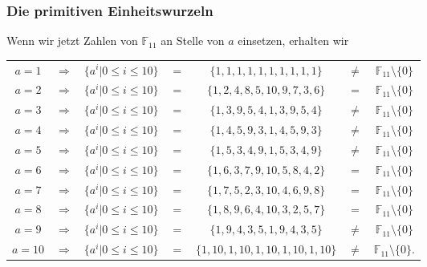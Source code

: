 \subsubsection{Die primitiven Einheitswurzeln
	\label{reedsolomon:subsection:primsqrt}}
%
%
Wenn wir jetzt Zahlen von $\mathbb{F}_{11}$ an Stelle von $a$ einsetzen, erhalten wir
\begin{center}
\begin{tabular}{c c c c c c c}
$a = 1$ & $\Rightarrow$ & $\{a^i | 0 \le i \le 10\}$ & $=$ & $\{1, 1, 1, 1, 1, 1, 1, 1, 1, 1\}$ & $\neq$ & $\mathbb{F}_{11}\setminus\{0\}$ \\
$a = 2$ & $\Rightarrow$ & $\{a^i | 0 \le i \le 10\}$ & $=$ & $\{1, 2, 4, 8, 5, 10, 9, 7, 3, 6\}$ & $ = $ & $\mathbb{F}_{11}\setminus\{0\}$ \\
$a = 3$ & $\Rightarrow$ & $\{a^i | 0 \le i \le 10\}$ & $=$ & $\{1, 3, 9, 5, 4, 1, 3, 9, 5, 4\}$ & $\neq$ & $\mathbb{F}_{11}\setminus\{0\}$ \\
$a = 4$ & $\Rightarrow$ & $\{a^i | 0 \le i \le 10\}$ & $=$ & $\{1, 4, 5, 9, 3, 1, 4, 5, 9, 3\}$ & $\neq$ & $\mathbb{F}_{11}\setminus\{0\}$ \\
$a = 5$ & $\Rightarrow$ & $\{a^i | 0 \le i \le 10\}$ & $=$ & $\{1, 5, 3, 4, 9, 1, 5, 3, 4, 9\}$ & $\neq$ & $\mathbb{F}_{11}\setminus\{0\}$ \\
$a = 6$ & $\Rightarrow$ & $\{a^i | 0 \le i \le 10\}$ & $=$ & $\{1, 6, 3, 7, 9, 10, 5, 8, 4, 2\}$ & $ = $ & $\mathbb{F}_{11}\setminus\{0\}$ \\
$a = 7$ & $\Rightarrow$ & $\{a^i | 0 \le i \le 10\}$ & $=$ & $\{1, 7, 5, 2, 3, 10, 4, 6, 9, 8\}$ & $ = $ & $\mathbb{F}_{11}\setminus\{0\}$ \\
$a = 8$ & $\Rightarrow$ & $\{a^i | 0 \le i \le 10\}$ & $=$ & $\{1, 8, 9, 6, 4, 10, 3, 2, 5, 7\}$ & $ = $ & $\mathbb{F}_{11}\setminus\{0\}$ \\
$a = 9$ & $\Rightarrow$ & $\{a^i | 0 \le i \le 10\}$ & $=$ & $\{1, 9, 4, 3, 5, 1, 9, 4, 3, 5\}$ & $\neq$ & $\mathbb{F}_{11}\setminus\{0\}$ \\
$a = 10$ & $\Rightarrow$ & $\{a^i | 0 \le i \le 10\}$ & $=$ & $\{1, 10, 1, 10, 1, 10, 1, 10, 1, 10\}$ & $\neq$ & $\mathbb{F}_{11}\setminus\{0\}$. \\
\end{tabular}
\end{center}
